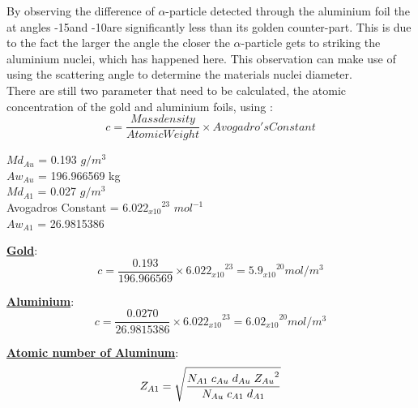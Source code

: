 \documentclass[12pt]{article}
\begin{document}
By observing the difference of $\alpha$-particle detected through the aluminium foil the at angles -15\textdegree and -10\textdegree are significantly less than its golden counter-part. This is due to the fact the larger the angle the closer the $\alpha$-particle gets to striking the aluminium nuclei, which has happened here. This observation can make use of using the scattering angle to determine the materials nuclei diameter. \\

There are still two parameter that need to be calculated, the atomic concentration of the gold and aluminium foils, using \cite{CRC}:  \\

\begin{equation}
{c} = \dfrac{Mass density}{Atomic Weight} \times Avogadro's Constant
\end{equation} 
\vspace{0.2cm}

\begin{multicols}{2}
$Md_{Au}$ = 0.193 $g/m^3$ \\
$Aw_{Au}$ = 196.966569 kg \\
$Md_{A1}$ = 0.027 $g/m^3$ \\
Avogadros Constant = ${6.022_{x10}}^{23}$ $mol^{-1}$  \\
$Aw_{A1}$ = 26.9815386 

\end{multicols}

\textbf{\underline{Gold}}: \\

\begin{equation}
{c} = \dfrac{0.193}{196.966569} \times {6.022_{x10}}^{23} = {5.9_{x10}}^{20} mol/m^3
\end{equation} 

\textbf{\underline{Aluminium}}: \\

\begin{equation}
{c} = \dfrac{0.0270}{26.9815386} \times {6.022_{x10}}^{23} = {6.02_{x10}}^{20} mol/m^3
\end{equation} 
\vspace{0.1cm}

\textbf{\underline{Atomic number of Aluminum}}: \\

\begin{equation}
{Z_{A1}} = \sqrt{\dfrac{N_{A1} \hspace{0.1cm} c_{Au} \hspace{0.1cm} d_{Au} \hspace{0.1cm} {Z_{Au}}^2}{N_{Au} \hspace{0.1cm} c_{A1} \hspace{0.1cm} d_{A1}}}
\label{Atom Ali}
\end{equation} 
\end{document}
